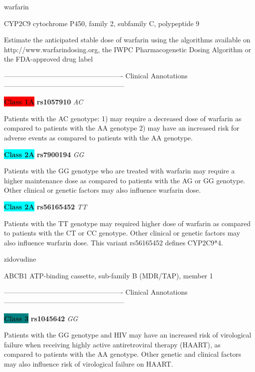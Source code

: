 \documentclass{resume} %
\begin{document}
\begin{rSection}{ warfarin }
\begin{rSubsection}{ CYP2C9 }{ cytochrome P450, family 2, subfamily C, polypeptide 9 }{}{}
\item[] Estimate the anticipated stable dose of warfarin using the algorithms available on http://www.warfarindosing.org, the IWPC Pharmacogenetic Dosing Algorithm or the FDA-approved drug label
\item[] ---------------------------------------------------- Clinical Annotations -----------------------------------------------------\newline
\item \textbf{\colorbox{red} {Class 1A}} \textbf{ rs1057910 } \textit{ AC }
\item[] Patients with the AC genotype: 1) may require a decreased dose of warfarin as compared to patients with the AA genotype 2) may have an increased risk for adverse events as compared to patients with the AA genotype.\item \textbf{\colorbox{cyan} {Class 2A}} \textbf{ rs7900194 } \textit{ GG }
\item[] Patients with the GG genotype who are treated with warfarin may require a higher maintenance dose as compared to patients with the AG or GG genotype.  Other clinical or genetic factors may also influence warfarin dose.\item \textbf{\colorbox{cyan} {Class 2A}} \textbf{ rs56165452 } \textit{ TT }
\item[] Patients with the TT genotype may required higher dose of warfarin as compared to patients with the CT or CC genotype. Other clinical or genetic factors may also influence  warfarin dose. This variant rs56165452 defines CYP2C9*4.
\end{rSubsection}

\end{rSection}\begin{rSection}{ zidovudine }
\item[]

\begin{rSubsection}{ ABCB1 }{ ATP-binding cassette, sub-family B (MDR/TAP), member 1 }{}{}
\item[]

\item[] ---------------------------------------------------- Clinical Annotations -----------------------------------------------------\newline
\item \textbf{\colorbox{teal} {Class 3}} \textbf{ rs1045642 } \textit{ GG }
\item[] Patients with the GG genotype and HIV may have an increased risk of virological failure when receiving highly active antiretroviral therapy (HAART), as compared to patients with the AA genotype. Other genetic and clinical factors may also influence risk of virological failure on HAART.
\end{rSubsection}

\end{rSection}
\end{document}
